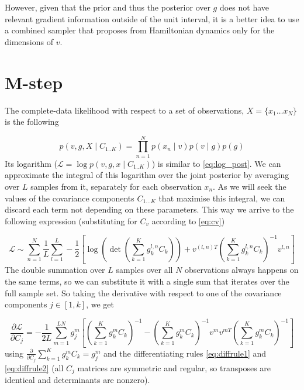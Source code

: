 \documentclass{paper}
\begin{document}
However, given that the prior and thus the posterior over $g$ does not have relevant gradient information outside of the unit interval, it is a better idea to use a combined sampler that proposes from Hamiltonian dynamics only for the dimensions of $v$.

\section{M-step}

The complete-data likelihood with respect to a set of observations, $X = \lbrace x_1 \dots x_N \rbrace$ is the following

\begin{equation}
p(v,g,X \mid C_{1..K}) = \prod_{n=1}^N p(x_n \mid v) p(v \mid g) p(g)
\end{equation}
%
Its logarithm ($\mathcal{L}=\log p(v,g,x \mid C_{1..K})$) is similar to \ref{eq:log_post}. We can approximate the integral of this logarithm over the joint posterior by averaging over $L$ samples from it, separately for each observation $x_n$. As we will seek the values of the covariance components $C_{1 \dots K}$ that maximise this integral, we can discard each term not depending on these parameters. This way we arrive to the following expression (substituting for $C_v$ according to \ref{eq:cv})

\begin{equation}
\mathcal{L} \sim \sum_{n=1}^N \frac{1}{L} \sum_{l=1}^L -\frac{1}{2} \left[\log \left( \det \left( \sum_{k=1}^K g_k^{l,n} C_k \right) \right) + v^{(l,n)T}  \left( \sum_{k=1}^K g_k^{l,n} C_k \right)^{-1} v^{l,n}\right]
\end{equation}
%
The double summation over $L$ samples over all $N$ observations always happens on the same terms, so we can substitute it with a single sum that iterates over the full sample set. So taking the derivative with respect to one of the covariance components $j \in \left[ 1,k \right]$, we get

\begin{equation}\label{eq:deriv}
\frac{\partial \mathcal{L}}{\partial C_j} = -\frac{1}{2L} \sum_{m=1}^{LN} g_j^m \left[ \left( \sum_{k=1}^K g_k^m C_k \right)^{-1} - \left( \sum_{k=1}^K g_k^m C_k \right)^{-1} v^m v^{mT} \left( \sum_{k=1}^K g_k^m C_k \right)^{-1} \right]
\end{equation}
%
using $\frac{\partial}{\partial C_j} \sum_{k=1}^K g_k^m C_k = g_j^m$ and the differentiating rules \ref{eq:diffrule1} and \ref{eq:diffrule2} (all $C_j$ matrices are symmetric and regular, so transposes are identical and determinants are nonzero).
\end{document}
